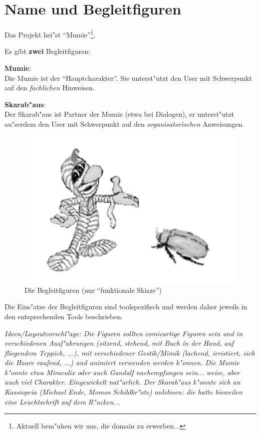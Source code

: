 
\section{Name und Begleitfiguren}\label{}

Das Projekt hei"st ``Mumie''\footnote{Aktuell bem"uhen wir uns, die
domain zu erwerben...}.

Es gibt \textbf{zwei} Begleitfiguren:

\begin{list_sabina}
\item
\textbf{Mumie}:\\
Die Mumie ist der ``Hauptcharakter''.
Sie unterst"utzt den User  mit Schwerpunkt auf den \textit{fachlichen} Hinweisen.
\item
\textbf{Skarab"aus}:\\
Der Skarab"aus ist Partner der Mumie (etwa bei Dialogen), er
unterst"utzt au"serdem den User mit Schwerpunkt auf den 
\textit{organisatorischen} Anweisungen.
\end{list_sabina}


\begin{figure}[h]
\begin{center}
\ifx\pdfoutput\undefined
\else
  \includegraphics{Skizzen/my_combi_02.pdf}
\fi
\caption{Die Begleitfiguren (nur ``funktionale Skizze'')}
\end{center}
\end{figure}


Die Eins"atze der Begleitfiguren sind toolspezifisch und werden 
daher jeweils in den entsprechenden Tools beschrieben.


\vspace{10mm}

{\footnotesize\textit{Ideen/Layoutvorschl"age: Die Figuren sollten
comicartige Figuren sein und in verschiedenen Ausf"uhrungen (sitzend,
stehend, mit Buch in der Hand, auf fliegendem Teppich, ...), mit
verschiedener Gestik/Mimik (lachend, irristiert, sich die Haare
raufend, ...) und animiert verwenden werden k"onnen. Die Mumie
k"onnte etwa Miraculix oder auch Gandalf nachempfungen sein... weise,
aber auch viel Charakter. Eingewickelt nat"urlich. Der Skarab"aus
k"onnte sich an Kassiopeia (Michael Ende, Momos Schildkr"ote)
anlehnen: die hatte bisweilen eine Leuchtschrift auf dem R"ucken...}}
